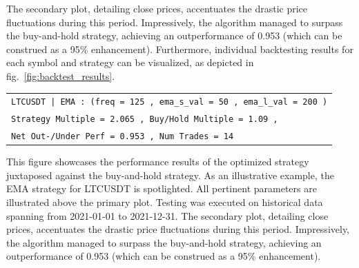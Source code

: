 The secondary plot, detailing close prices, accentuates the drastic price fluctuations during this period.
Impressively, the algorithm managed to surpass the buy-and-hold strategy, achieving an outperformance of 0.953 (which can be construed as a 95\% enhancement).
Furthermore, individual backtesting results for each symbol and strategy can be visualized, as depicted in fig.~\ref{fig:backtest_results}.

\begin{table}[H]
    \centering
    \begin{tabular}{l}
        \texttt{LTCUSDT | EMA : (freq = 125 , ema\_s\_val = 50 , ema\_l\_val = 200 )} \\
        \texttt{Strategy Multiple = 2.065 , Buy/Hold Multiple = 1.09 ,} \\
        \texttt{Net Out-/Under Perf = 0.953 , Num Trades = 14} \\
    \end{tabular}
\end{table}
This figure showcases the performance results of the optimized strategy juxtaposed against the buy-and-hold strategy.
As an illustrative example, the EMA strategy for LTCUSDT is spotlighted. All pertinent parameters are illustrated above the primary plot.
Testing was executed on historical data spanning from 2021-01-01 to 2021-12-31.
The secondary plot, detailing close prices, accentuates the drastic price fluctuations during this period.
Impressively, the algorithm managed to surpass the buy-and-hold strategy, achieving an outperformance of 0.953 (which can be construed as a 95\% enhancement).









